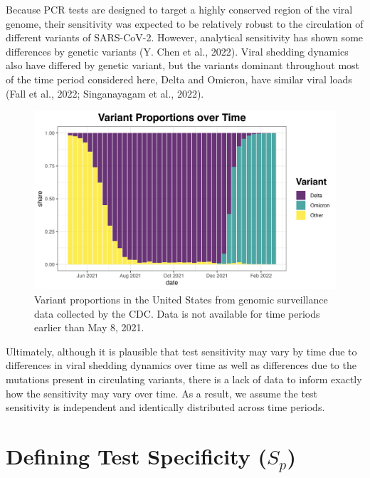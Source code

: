 \documentclass[12pt,twoside]{smiththesis}
\begin{document}
Because PCR tests are designed to target a highly conserved region of the viral genome, their sensitivity was expected to be relatively robust to the circulation of different variants of SARS-CoV-2. However, analytical sensitivity has shown some differences by genetic variants (Y. Chen et al., 2022). Viral shedding dynamics also have differed by genetic variant, but the variants dominant throughout most of the time period considered here, Delta and Omicron, have similar viral loads (Fall et al., 2022; Singanayagam et al., 2022).
\begin{figure}

{\centering \includegraphics[width=0.8\linewidth]{./figure/variant_plot} 

}

\caption{Variant proportions in the United States from genomic surveillance data collected by the CDC. Data is not available for time periods earlier than May 8, 2021.}\label{fig:unnamed-chunk-60}
\end{figure}
Ultimately, although it is plausible that test sensitivity may vary by time due to differences in viral shedding dynamics over time as well as differences due to the mutations present in circulating variants, there is a lack of data to inform exactly how the sensitivity may vary over time. As a result, we assume the test sensitivity is independent and identically distributed across time periods.

\hypertarget{defining-test-specificity-s_p}{%
\section{\texorpdfstring{Defining Test Specificity (\(S_p\))}{Defining Test Specificity (S\_p)}}\label{defining-test-specificity-s_p}}
\end{document}
